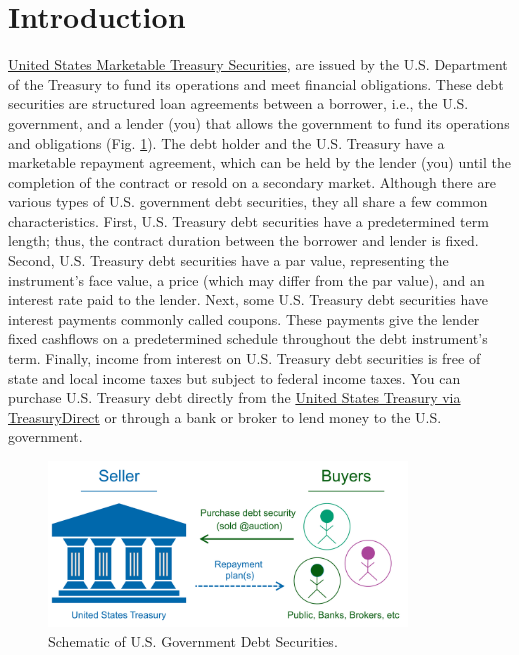 \documentclass[11pt]{article}
\theoremstyle{definition}
\begin{document}


\section*{Introduction}
\href{https://www.investor.gov/introduction-investing/investing-basics/glossary/treasury-securities}{United States Marketable Treasury Securities}, 
are issued by the U.S. Department of the Treasury to fund its operations and meet financial obligations. 
These debt securities are structured loan agreements between a borrower, i.e., the U.S. government, and a lender (you) 
that allows the government to fund its operations and obligations (Fig. \ref{fig:govt-debt-schematic}).
The debt holder and the U.S. Treasury have a marketable repayment agreement, which can be held by the lender (you) until the completion of the contract or resold on a secondary market. Although there are various types of U.S. government debt securities, they all share a few common characteristics. 
First, U.S. Treasury debt securities have a predetermined term length; thus, the contract duration between the borrower and lender is fixed.
Second, U.S. Treasury debt securities have a par value, representing the instrument's face value, a price (which may differ from the par value), and an interest rate paid to the lender. Next, some U.S. Treasury debt securities have interest payments commonly called coupons. These payments give the lender fixed cashflows on a predetermined schedule throughout the debt instrument's term. Finally, income from interest on U.S. Treasury debt securities is free of state and local income taxes but subject to federal income taxes.
You can purchase U.S. Treasury debt directly from the \href{https://www.treasurydirect.gov/indiv/products/prod_tbonds_glance.htm}{United States Treasury via TreasuryDirect} 
or through a bank or broker to lend money to the U.S. government.

\begin{figure}[h]
    \centering
    \includegraphics[width=0.85\textwidth]{./figs/Fig-Govt-Debt-Schematic.pdf}
    \caption{Schematic of U.S. Government Debt Securities. }\label{fig:govt-debt-schematic}
\end{figure}
\end{document}
